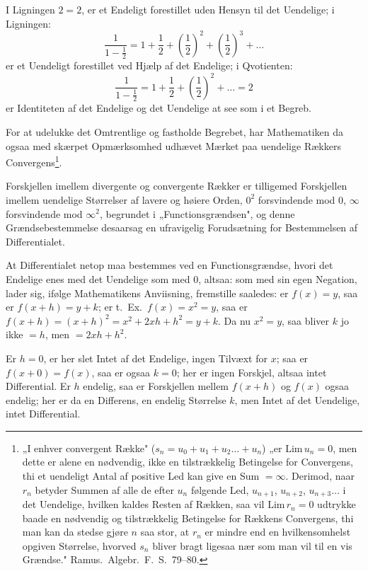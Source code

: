 \documentclass[12pt]{book}
\newcommand{\opage}[1]{\marginnote{\footnotesize\textit{[#1]}}}
\begin{document}
I Ligningen $2 = 2$, er et Endeligt forestillet uden Hensyn til det Uendelige; i
Ligningen:
\[
\frac{1}{1-\frac{1}{2}} = 1 + \frac{1}{2} + \left(\frac{1}{2}\right)^{2}
+ \left(\frac{1}{2}\right)^{3} + \dots
\]
er et Uendeligt forestillet ved Hjælp af det Endelige; i Qvotienten:
\[
\frac{1}{1-\frac{1}{2}} = 1 + \frac{1}{2} + \left(\frac{1}{2}\right)^{2}
+ \dots = 2
\]
er Identiteten af det Endelige og det Uendelige at see som i et Begreb.

For at udelukke det Omtrentlige og fastholde Begrebet, har Mathematiken da ogsaa
med skærpet Opmærksomhed udhævet Mærket paa uendelige Rækkers
Convergens\footnote{„I enhver convergent Række" ($s_n = u_0 + u_1 + u_2 \dots +
u_n$) „er $\mathrm{Lim}\, u_n = 0$, men dette er alene en nødvendig, ikke en
tilstrækkelig Betingelse for Convergens, thi et uendeligt Antal af positive Led
kan give en Sum $= \infty$. Derimod, naar $r_n$ betyder Summen af alle de efter
$u_n$ følgende Led, $u_{n+1}$, $u_{n+2}$, $u_{n+3} \dots$ i det Uendelige, hvilken
kaldes Resten af Rækken, saa vil $\mathrm{Lim}\, r_n = 0$ udtrykke baade en
nødvendig og tilstrækkelig Betingelse for Rækkens Convergens, thi man kan da stedse
gjøre $n$ saa stor, at $r_n$ er mindre end en hvilkensomhelst opgiven Størrelse,
hvorved $s_n$ bliver bragt ligesaa nær som man vil til en vis Grændse." Ramus.\
Algebr.\ F.\ S.\ 79--80.}.

Forskjellen imellem divergente og convergente Rækker er tilligemed Forskjellen
imellem uendelige Størrelser af lavere og høiere Orden, $0^{2}$ forsvindende mod 0,
$\infty$ forsvindende mod $\infty^{2}$, begrundet i „Functionsgrændsen", og denne
Grændsebestemmelse desaarsag en ufravigelig Forudsætning for Bestemmelsen af
Differentialet.

At Differentialet netop maa bestemmes ved en Functionsgrændse, hvori det Endelige
enes med det Uendelige
\opage{55} som med 0, altsaa: som med sin egen Negation, lader sig, ifølge Mathematikens
Anviisning, fremstille saaledes: er $f(x) = y$, saa er $f(x + h) = y + k$; er
t.\ Ex.\ $f(x) = x^{2} = y$, saa er $f(x + h) = (x + h)^{2} = x^{2} + 2xh + h^{2}
= y + k$. Da nu $x^{2} = y$, saa bliver $k$ jo ikke $= h$, men $= 2xh + h^{2}$.

Er $h = 0$, er her slet Intet af det Endelige, ingen Tilvæxt for $x$; saa er
$f(x + 0) = f(x)$, saa er ogsaa $k = 0$; her er ingen Forskjel, altsaa intet
Differential. Er $h$ endelig, saa er Forskjellen mellem $f(x + h)$ og $f(x)$ ogsaa
endelig; her er da en Differens, en endelig Størrelse $k$, men Intet af det
Uendelige, intet Differential.
\end{document}
